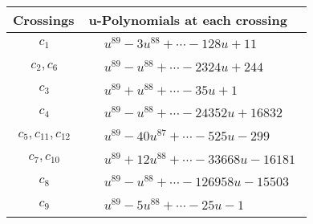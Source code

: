 \documentclass[1p]{elsarticle_modified}
\theoremstyle{definition}
\begin{document}
\begin{tabular}{m{50pt}|m{274pt}}
Crossings & \hspace{64pt}u-Polynomials at each crossing \\
\hline $$\begin{aligned}c_{1}\end{aligned}$$&$\begin{aligned}
&u^{89}-3 u^{88}+\cdots-128 u+11
\end{aligned}$\\
\hline $$\begin{aligned}c_{2},c_{6}\end{aligned}$$&$\begin{aligned}
&u^{89}- u^{88}+\cdots-2324 u+244
\end{aligned}$\\
\hline $$\begin{aligned}c_{3}\end{aligned}$$&$\begin{aligned}
&u^{89}+u^{88}+\cdots-35 u+1
\end{aligned}$\\
\hline $$\begin{aligned}c_{4}\end{aligned}$$&$\begin{aligned}
&u^{89}- u^{88}+\cdots-24352 u+16832
\end{aligned}$\\
\hline $$\begin{aligned}c_{5},c_{11},c_{12}\end{aligned}$$&$\begin{aligned}
&u^{89}-40 u^{87}+\cdots-525 u-299
\end{aligned}$\\
\hline $$\begin{aligned}c_{7},c_{10}\end{aligned}$$&$\begin{aligned}
&u^{89}+12 u^{88}+\cdots-33668 u-16181
\end{aligned}$\\
\hline $$\begin{aligned}c_{8}\end{aligned}$$&$\begin{aligned}
&u^{89}- u^{88}+\cdots-126958 u-15503
\end{aligned}$\\
\hline $$\begin{aligned}c_{9}\end{aligned}$$&$\begin{aligned}
&u^{89}-5 u^{88}+\cdots-25 u-1
\end{aligned}$\\
\hline
\end{tabular}\\~\\
\end{document}
